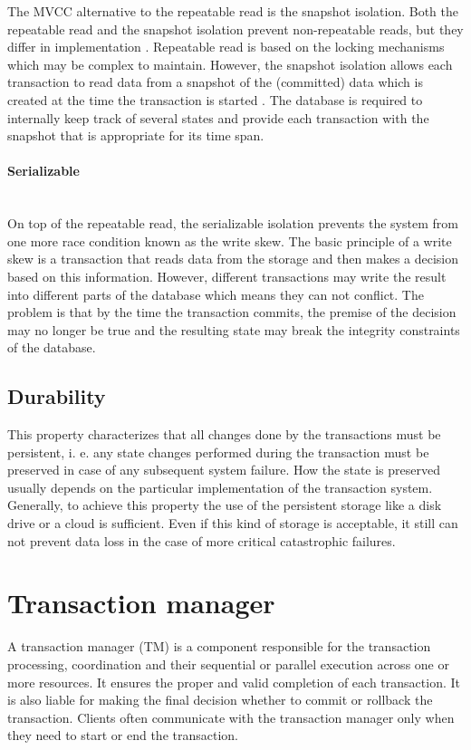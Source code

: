 \documentclass[oneside,
  digital, %
  table,   %
  nolof,     %
  nolot,     %
]{fithesis3}
\newcommand{\newlinepar}[1]{\paragraph{#1}\needspace{4\baselineskip}\mbox{}\\}
\begin{document}
The MVCC alternative to the repeatable read is the snapshot isolation. Both the repeatable read and the snapshot isolation prevent non-repeatable reads, but they differ in implementation \cite{isolation_levels}. Repeatable read is based on the locking mechanisms which may be complex to maintain. However, the snapshot isolation allows each transaction to read data from a snapshot of the (committed) data which is created at the time the transaction is started \cite{ansi-sql-critique}. The database is required to internally keep track of several states and provide each transaction with the snapshot that is appropriate for its time span.

\newlinepar{Serializable}

On top of the repeatable read, the serializable isolation prevents the system from one more race condition known as the write skew. The basic principle of a write skew is a transaction that reads data from the storage and then makes a decision based on this information. However, different transactions may write the result into different parts of the database which means they can not conflict. The problem is that by the time the transaction commits, the premise of the decision may no longer be true and the resulting state may break the integrity constraints of the database.

\subsection{Durability}

This property characterizes that all changes done by the transactions must be persistent, i. e. any state changes performed during the transaction must be preserved in case of any subsequent system failure. How the state is preserved usually depends on the particular implementation of the transaction system. Generally, to achieve this property the use of the persistent storage like a disk drive or a cloud is sufficient. Even if this kind of storage is acceptable, it still can not prevent data loss in the case of more critical catastrophic failures.


\section{Transaction manager}
\label{sec:transaction-manager}

A transaction manager (TM) is a component responsible for the transaction processing, coordination and their sequential or parallel execution across one or more resources. It ensures the proper and valid completion of each transaction. It is also liable for making the final decision whether to commit or rollback the transaction. Clients often communicate with the transaction manager only when they need to start or end the transaction.
\end{document}
